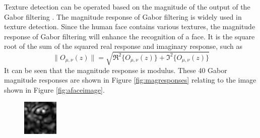 Texture detection can be operated based on the magnitude of the output of the Gabor filtering \cite{Bovik1990}. The magnitude response of Gabor filtering is widely used in texture detection. Since the human face contains various textures, the magnitude response of Gabor filtering will enhance the recognition of a face. It is the square root of the sum of the squared real response and imaginary response, such as
\begin{equation}
 \|O_{\mu,\nu}(z)\| = \sqrt{\Re^2\{O_{\mu,\nu}(z)\} + \Im^2\{O_{\mu,\nu}(z)\}}
\end{equation}
It can be seen that the magnitude response is modulus. These 40 Gabor magnitude responses are shown in \mbox{Figure} \ref{fig:magresponses} relating to the image shown in \mbox{Figure} \ref{fig:afaceimage}.
\begin{figure}[ht]
\begin{center}
 \includegraphics[width=\columnwidth/9]{ch4/figures/mag_-1_0.jpg}

\end{center}
\end{figure}
